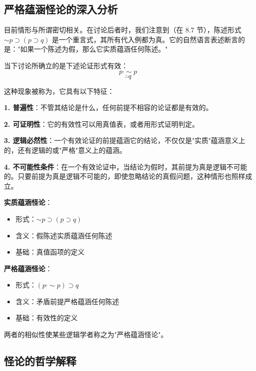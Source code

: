 \subsection{严格蕴涵怪论的深入分析}

目前情形与所谓密切相关。在讨论后者时，我们注意到（在 8.7 节），陈述形式 $\sim p \supset (p \supset q)$ 是一个重言式，其所有代入例都为真。它的自然语言表述断言的是："如果一个陈述为假，那么它实质蕴涵任何陈述。"

\begin{theorembox}[title=严格蕴涵怪论的逻辑结构]
当下讨论所确立的是下述论证形式有效：
$$p \cdot \sim p$$
$$\therefore q$$

这种现象被称为，它具有以下特征：

\textbf{1. 普遍性}：不管其结论是什么，任何前提不相容的论证都是有效的。

\textbf{2. 可证明性}：它的有效性可以用真值表，或者用形式证明判定。

\textbf{3. 逻辑必然性}：一个有效论证的前提蕴涵它的结论，不仅仅是"实质"蕴涵意义上的，还有逻辑的或"严格"意义上的蕴涵。

\textbf{4. 不可能性条件}：在一个有效论证中，当结论为假时，其前提为真是逻辑不可能的。只要前提为真是逻辑不可能的，即使忽略结论的真假问题，这种情形也照样成立。
\end{theorembox}

\begin{examplebox}[title=严格蕴涵怪论与实质蕴涵怪论的比较]
\textbf{实质蕴涵怪论}：
\begin{itemize}
\item 形式：$\sim p \supset (p \supset q)$
\item 含义：假陈述实质蕴涵任何陈述
\item 基础：真值函项的定义
\end{itemize}

\textbf{严格蕴涵怪论}：
\begin{itemize}
\item 形式：$(p \cdot \sim p) \supset q$
\item 含义：矛盾前提严格蕴涵任何陈述
\item 基础：有效性的定义
\end{itemize}

两者的相似性使某些逻辑学者称之为"严格蕴涵怪论"。
\end{examplebox}

\subsection{怪论的哲学解释}


